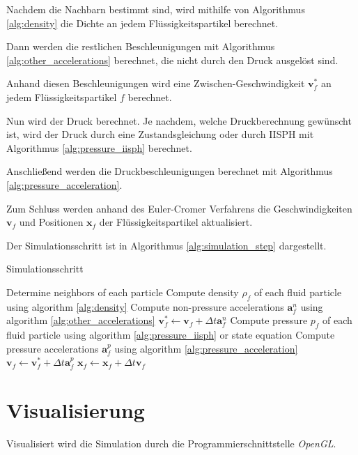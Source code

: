 \documentclass[11pt,
a4paper,
parskip=half, %
BCOR=10mm, %
english,
ngerman]{scrreprt}
\begin{document}
Nachdem die Nachbarn bestimmt sind, wird mithilfe von Algorithmus \ref{alg:density} die Dichte an jedem Flüssigkeitspartikel berechnet.

Dann werden die restlichen Beschleunigungen mit Algorithmus \ref{alg:other_accelerations} berechnet, die nicht durch den Druck ausgelöst sind.

Anhand diesen Beschleunigungen wird eine Zwischen-Geschwindigkeit $\textbf{v}_f^*$ an jedem Flüssigkeitspartikel $f$ berechnet.

Nun wird der Druck berechnet. Je nachdem, welche Druckberechnung gewünscht ist,
wird der Druck durch eine Zustandsgleichung oder durch IISPH mit Algorithmus \ref{alg:pressure_iisph} berechnet.

Anschließend werden die Druckbeschleunigungen berechnet mit Algorithmus \ref{alg:pressure_acceleration}.

Zum Schluss werden anhand des Euler-Cromer Verfahrens die Geschwindigkeiten $\textbf{v}_f$ und Positionen $\textbf{x}_f$ der Flüssigkeitspartikel aktualisiert.

Der Simulationsschritt ist in Algorithmus \ref{alg:simulation_step} dargestellt.

\begin{algorithm}
    \caption{Simulationsschritt}
    \label{alg:simulation_step}
    \begin{algorithmic}[1]
        \State Determine neighbors of each particle
        \State Compute density $\rho_f$ of each fluid particle using algorithm \ref{alg:density}
        \State Compute non-pressure accelerations $\textbf{a}_f^n$ using algorithm \ref{alg:other_accelerations}
            \State $\textbf{v}_f^* \gets \textbf{v}_f + \Delta t \textbf{a}_f^n$
        \EndFor
        \State Compute pressure $p_f$ of each fluid particle using algorithm \ref{alg:pressure_iisph} or state equation
        \State Compute pressure accelerations $\textbf{a}_f^p$ using algorithm \ref{alg:pressure_acceleration}
            \State $\textbf{v}_f \gets \textbf{v}_f^* + \Delta t \textbf{a}_f^p$
        \EndFor
            \State $\textbf{x}_f \gets \textbf{x}_f + \Delta t \textbf{v}_f$
        \EndFor
        \State 
    \end{algorithmic}
    \end{algorithm}


\section{Visualisierung}
Visualisiert wird die Simulation durch die Programmierschnittstelle \textit{OpenGL}.
\end{document}
